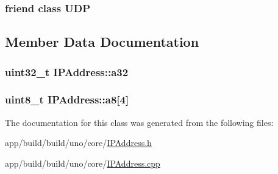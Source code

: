 \hypertarget{class_i_p_address_a480cf93423716d22666c9c3f17177736}{
\subsubsection[{U\-D\-P}]{\setlength{\rightskip}{0pt plus 5cm}friend class U\-D\-P\hspace{0.3cm}{\ttfamily [friend]}}}\label{class_i_p_address_a480cf93423716d22666c9c3f17177736}


\subsection{Member Data Documentation}
\hypertarget{class_i_p_address_aa8cefc7dc5ddf383b90878290cb7e05d}{
\subsubsection[{a32}]{\setlength{\rightskip}{0pt plus 5cm}uint32\-\_\-t I\-P\-Address\-::a32}}\label{class_i_p_address_aa8cefc7dc5ddf383b90878290cb7e05d}
\hypertarget{class_i_p_address_af7292df872b2a34b237dc3a6c79a7756}{
\subsubsection[{a8}]{\setlength{\rightskip}{0pt plus 5cm}uint8\-\_\-t I\-P\-Address\-::a8\mbox{[}4\mbox{]}}}\label{class_i_p_address_af7292df872b2a34b237dc3a6c79a7756}


The documentation for this class was generated from the following files\-:\begin{DoxyCompactItemize}
\item 
app/build/build/uno/core/\hyperlink{_i_p_address_8h}{I\-P\-Address.\-h}\item 
app/build/build/uno/core/\hyperlink{_i_p_address_8cpp}{I\-P\-Address.\-cpp}\end{DoxyCompactItemize}
